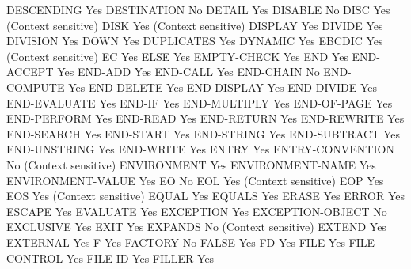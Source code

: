 DESCENDING                      Yes
DESTINATION                     No
DETAIL                          Yes
DISABLE                         No
DISC                            Yes (Context sensitive)
DISK                            Yes (Context sensitive)
DISPLAY                         Yes
DIVIDE                          Yes
DIVISION                        Yes
DOWN                            Yes
DUPLICATES                      Yes
DYNAMIC                         Yes
EBCDIC                          Yes (Context sensitive)
EC                              Yes
ELSE                            Yes
EMPTY-CHECK                     Yes
END                             Yes
END-ACCEPT                      Yes
END-ADD                         Yes
END-CALL                        Yes
END-CHAIN                       No
END-COMPUTE                     Yes
END-DELETE                      Yes
END-DISPLAY                     Yes
END-DIVIDE                      Yes
END-EVALUATE                    Yes
END-IF                          Yes
END-MULTIPLY                    Yes
END-OF-PAGE                     Yes
END-PERFORM                     Yes
END-READ                        Yes
END-RETURN                      Yes
END-REWRITE                     Yes
END-SEARCH                      Yes
END-START                       Yes
END-STRING                      Yes
END-SUBTRACT                    Yes
END-UNSTRING                    Yes
END-WRITE                       Yes
ENTRY                           Yes
ENTRY-CONVENTION                No (Context sensitive)
ENVIRONMENT                     Yes
ENVIRONMENT-NAME                Yes
ENVIRONMENT-VALUE               Yes
EO                              No
EOL                             Yes (Context sensitive)
EOP                             Yes
EOS                             Yes (Context sensitive)
EQUAL                           Yes
EQUALS                          Yes
ERASE                           Yes
ERROR                           Yes
ESCAPE                          Yes
EVALUATE                        Yes
EXCEPTION                       Yes
EXCEPTION-OBJECT                No
EXCLUSIVE                       Yes
EXIT                            Yes
EXPANDS                         No (Context sensitive)
EXTEND                          Yes
EXTERNAL                        Yes
F                               Yes
FACTORY                         No
FALSE                           Yes
FD                              Yes
FILE                            Yes
FILE-CONTROL                    Yes
FILE-ID                         Yes
FILLER                          Yes
